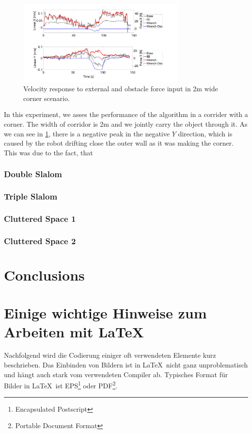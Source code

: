 \begin{figure}
   \centering
   \includegraphics[width=0.75\textwidth]{images/test16.jpg}
   \caption{Velocity response to external and obstacle force input in \unit{2}{m} wide corner scenario.}
   \label{pics:test16}
\end{figure}

In this experiment, we asses the performance of the algorithm in a corrider with a corner. The width of corridor is \unit{2}{m} and we jointly carry the object through it. As we can see in \cref{pics:test16}, there is a negative peak in the negative $Y$
direction, which is caused by the robot drifting close the outer wall as it was making the corner. This was due to the fact, that

\subsection{Double Slalom}
\subsection{Triple Slalom}
\subsection{Cluttered Space 1}
\subsection{Cluttered Space 2}
\chapter{Conclusions}

\chapter{Einige wichtige Hinweise zum Arbeiten mit \LaTeX\ }
\label{sec:latexumg}

Nachfolgend wird die Codierung einiger oft verwendeten Elemente
kurz beschrieben. Das Einbinden von Bildern ist in \LaTeX\ nicht
ganz unproblematisch und hängt auch stark vom verwendeten Compiler
ab. Typisches Format für Bilder in \LaTeX\ ist
EPS\footnote{Encapsulated Postscript} oder PDF\footnote{Portable Document Format}.


